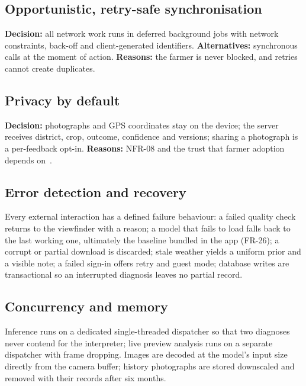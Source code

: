 \subsection{Opportunistic, retry-safe synchronisation}
\textbf{Decision:} all network work runs in deferred background jobs with network constraints, back-off and client-generated identifiers. \textbf{Alternatives:} synchronous calls at the moment of action. \textbf{Reasons:} the farmer is never blocked, and retries cannot create duplicates.

\subsection{Privacy by default}
\textbf{Decision:} photographs and GPS coordinates stay on the device; the server receives district, crop, outcome, confidence and versions; sharing a photograph is a per-feedback opt-in. \textbf{Reasons:} NFR-08 and the trust that farmer adoption depends on~\cite{soodan2024adoption}.

\subsection{Error detection and recovery}
Every external interaction has a defined failure behaviour: a failed quality check returns to the viewfinder with a reason; a model that fails to load falls back to the last working one, ultimately the baseline bundled in the app (FR-26); a corrupt or partial download is discarded; stale weather yields a uniform prior and a visible note; a failed sign-in offers retry and guest mode; database writes are transactional so an interrupted diagnosis leaves no partial record.

\subsection{Concurrency and memory}
Inference runs on a dedicated single-threaded dispatcher so that two diagnoses never contend for the interpreter; live preview analysis runs on a separate dispatcher with frame dropping. Images are decoded at the model's input size directly from the camera buffer; history photographs are stored downscaled and removed with their records after six months.

